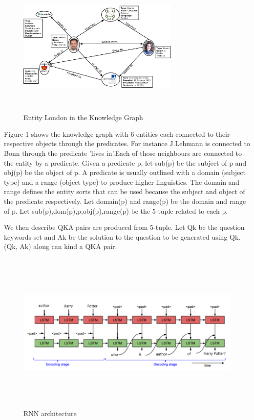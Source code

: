 \documentclass[conference]{IEEEtran}
\begin{document}
\begin{figure}[htpb]
\centerline{\includegraphics[height=7cm,width=8cm]{kg.png}}
\caption{Entity London in the Knowledge Graph}
\label{fig}
\end{figure}
Figure 1 shows the knowledge graph with 6 entities each connected to their respective objects through the predicates. For instance J.Lehmann is connected to Bonn through the predicate 'lives in'.Each of those neighbours are connected to the entity by a predicate. Given a predicate p, let sub(p) be the subject of p and obj(p) be the object of p. A predicate is usually outlined with a domain (subject type) and a range (object type) to produce higher linguistics. The domain and range defines the entity sorts that can be used because the subject and object of the predicate respectively. Let domain(p) and range(p) be the domain and range of p. Let {sub(p),dom(p),p,obj(p),range(p)} be the 5-tuple related to each p. 

We then describe QKA pairs are produced from 5-tuple. Let Qk be the question keywords set and Ak be the solution to the question to be generated using Qk. (Qk, Ak) along can kind a QKA pair. 
\newline
\begin{figure}[t]
\centerline{\includegraphics[height=8cm]{architecture.PNG}}
\caption{RNN architecture}
\label{fig}
\end{figure}
\end{document}
